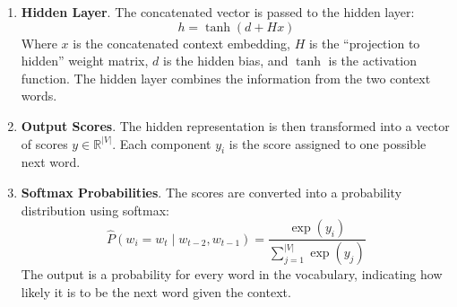\begin{examplebox}
\begin{enumerate}
        \item \textbf{Hidden Layer}. The concatenated vector is passed to the hidden layer:
        \begin{equation*}
            h = \tanh\left(d + Hx\right)
        \end{equation*}
        Where $x$ is the concatenated context embedding, $H$ is the ``projection to hidden'' weight matrix, $d$ is the hidden bias, and $\tanh$ is the activation function. The hidden layer combines the information from the two context words.


        \item \textbf{Output Scores}. The hidden representation is then transformed into a vector of scores $y \in \mathbb{R}^{\left|V\right|}$. Each component $y_i$ is the score assigned to one possible next word.
        

        \item \textbf{Softmax Probabilities}. The scores are converted into a probability distribution using softmax:
        \begin{equation*}
            \hat{P}\left(w_i = w_t \mid w_{t-2}, w_{t-1}\right) = \frac{\exp\left(y_i\right)}{\sum_{j=1}^{\left|V\right|} \exp\left(y_j\right)}
        \end{equation*}
        The output is a probability for every word in the vocabulary, indicating how likely it is to be the next word given the context.



\end{enumerate}
\end{examplebox}
